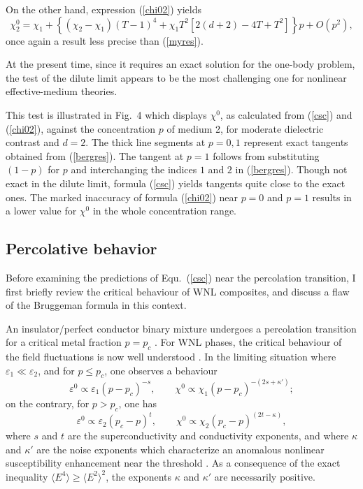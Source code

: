 On the other hand, expression (\ref{chi02}) yields
\begin{equation}
\chi^0_2=\chi_1+\left\{(\chi_2-\chi_1) (T-1)^4+
\chi_1T^2\left[2(d+2)-4T+T^2\right]\right\}p+O(p^2),
\end{equation}
once again a result less precise than (\ref{myres}).

At the present time, since it requires an exact solution for 
the one-body problem, the test of the dilute limit appears to be 
the most challenging one for nonlinear effective-medium theories. 

This test is illustrated in Fig.\ 4 which displays $\chi^0$, as 
calculated from (\ref{csc}) and (\ref{chi02}), against the 
concentration $p$ of medium 2, for moderate dielectric contrast 
and $d=2$. The thick line segments at $p=0,1$ represent exact 
tangents obtained from (\ref{bergres}). The tangent at $p=1$ 
follows from substituting $(1-p)$ for $p$ and interchanging the 
indices $1$ and $2$ in (\ref{bergres}). Though not exact in the 
dilute limit, formula (\ref{csc}) yields tangents quite close to 
the exact ones. The marked inaccuracy of formula (\ref{chi02}) 
near $p=0$ and $p=1$ results in a lower value for $\chi^0$ in 
the whole concentration range.  

\subsection{Percolative behavior}
Before examining the predictions of Equ.\ (\ref{csc}) near the 
percolation transition, I first briefly review the critical 
behaviour of WNL composites, and discuss a flaw of the 
Bruggeman formula in this context.
 
An insulator/perfect conductor binary mixture undergoes a 
percolation transition for a critical metal fraction 
$p=p_c$ \cite{CLER90}. For WNL phases, the critical behaviour 
of the field fluctuations is now well understood 
\cite{WRIG86}. In the limiting situation where 
$\varepsilon_1\ll \varepsilon_2$, and for $p\leq p_c$, 
one observes a behaviour
\begin{equation}
\varepsilon^0\propto \varepsilon_1(p-p_c)^{-s},
\qquad\chi^0\propto \chi_1(p-p_c)^{-(2s+\kappa')};
\end{equation}
on the contrary, for $p>p_c$, one has
\begin{equation}
\varepsilon^0\propto \varepsilon_2(p_c-p)^{t},\qquad\chi^0
\propto \chi_2(p_c-p)^{(2t-\kappa)},
\end{equation}
where $s$ and $t$ are the superconductivity and conductivity 
exponents, and where $\kappa$ and $\kappa'$ are the noise 
exponents which characterize an anomalous nonlinear 
susceptibility enhancement near the threshold 
\cite{RAMM85,WRIG86}. As a consequence of the exact 
inequality $\langle E^4\rangle\ge\langle E^2\rangle^2$, 
the exponents $\kappa$ and $\kappa'$ are necessarily 
positive. 

